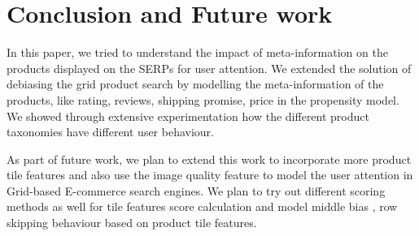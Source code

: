 \documentclass[11pt]{article}
\begin{document}
\section{Conclusion and Future work}
In this paper, we tried to understand the impact of meta-information on the products displayed on the SERPs for user attention. We extended the solution of debiasing the grid product search by modelling the meta-information of the products, like rating, reviews, shipping promise, price in the propensity model. We showed through extensive experimentation how the different product taxonomies have different user behaviour.

As part of future work, we plan to extend this work to incorporate more product tile features and also use the image quality feature to model the user attention in Grid-based E-commerce search engines. We plan to try out different scoring methods as well for tile features score calculation and model middle bias , row skipping behaviour based on product tile features.
\end{document}
